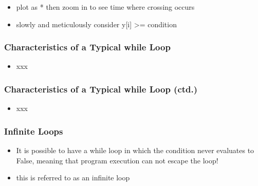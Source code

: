\documentclass[english,14pt]{beamer}
\begin{document}

\begin{frame}[fragile]

\frametitle{}

\begin{itemize}
	\item plot as * then zoom in to see time where crossing occurs
	\item slowly and meticulously consider y[i] >= condition
\end{itemize}

\end{frame}


\begin{frame}[fragile]

\frametitle{Characteristics of a Typical while Loop}

\begin{itemize}
	\item xxx
\end{itemize}

\end{frame}


\begin{frame}[fragile]

\frametitle{Characteristics of a Typical while Loop (ctd.)}

\begin{itemize}
	\item xxx
\end{itemize}

\end{frame}


\begin{frame}[fragile]

\frametitle{Infinite Loops}

\begin{itemize}
	\item It is possible to have a while loop in which the condition never evaluates to False, meaning that program execution can not escape the loop!
	\item this is referred to as an infinite loop
\end{itemize}

\end{frame}
\end{document}
